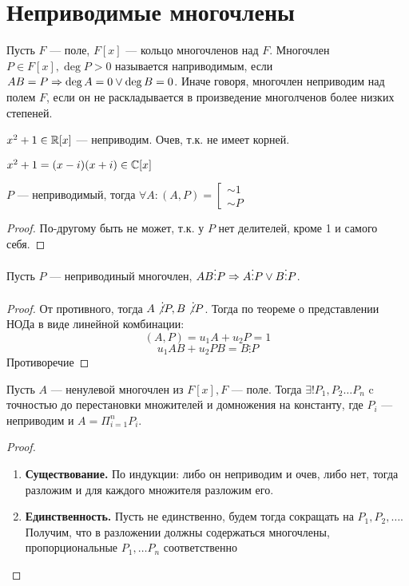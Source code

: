 
\section{Неприводимые многочлены}
\begin{definition}
    Пусть \(F\) --- поле, \(F[x]\) --- кольцо многочленов над \(F\). Многочлен \(P \in F[x], \deg P > 0\) называется наприводимым, если \(AB = P \Rightarrow \deg A = 0 \vee \deg B = 0\). Иначе говоря, многочлен неприводим над полем \(F\), если он не раскладывается в произведение многолченов более низких степеней.
\end{definition}

\begin{example}
    \(x^2 + 1 \in \mathbb{R}[x]\) --- неприводим. Очев, т.к. не имеет корней.
\end{example}
\begin{example}
    \(x^2 + 1 = (x - i)(x + i) \in \mathbb{C}[x]\)
\end{example}
\begin{proposition}
    \(P\) --- неприводимый, тогда \(\forall A: (A, P) = \left[\begin{array}{l}
        \sim 1 \\
        \sim P
    \end{array}\right.\)
\end{proposition}
\begin{proof}
    По-другому быть не может, т.к. у \(P\) нет делителей, кроме 1 и самого себя.
\end{proof}
\begin{lemma}[Евклида]
    Пусть \(P\) --- неприводиный многочлен, \(AB \vdots P \Rightarrow A \vdots P \vee B \vdots P\).
\end{lemma}
\begin{proof}
    От противного, тогда \(A \not\vdots P, B \not\vdots P\). Тогда по теореме о представлении НОДа в виде линейной комбинации:
    \[(A, P) = u_1A + u_2P = 1\]
    \[u_1AB + u_2PB = B \vdots P\]
    Противоречие
\end{proof}

\begin{theorem}
    Пусть \(A\) --- ненулевой многочлен из \(F[x], F\) --- поле. Тогда \(\exists! P_1, P_2 \dots P_n\) c точностью до перестановки множителей и домножения на константу, где \(P_i\) --- неприводим и \(A = \Pi_{i = 1}^n P_i\).
\end{theorem}
\begin{proof}\indent
    \begin{enumerate}
        \item[] \textbf{Существование.} По индукции: либо он неприводим и очев, либо нет, тогда разложим и для каждого множителя разложим его.
        \item[] \textbf{Единственность.} Пусть не единственно, будем тогда сокращать на \(P_1, P_2, \dots\). Получим, что в разложении должны содержаться многочлены, пропорциональные \(P_1, \dots P_n\) соответственно
    \end{enumerate}
\end{proof}

